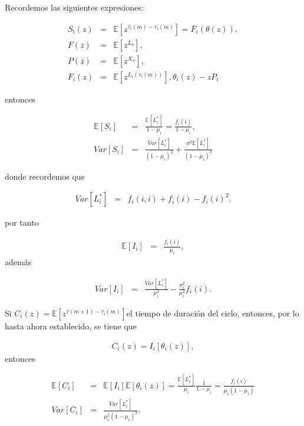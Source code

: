 \documentclass{article}
\newcommand{\esp}{\mathbb{E}}
\begin{document}
Recordemos las siguientes expresiones:

\begin{eqnarray*}
S_{i}\left(z\right)&=&\esp\left[z^{\overline{\tau}_{i}\left(m\right)-\tau_{i}\left(m\right)}\right]=F_{i}\left(\theta\left(z\right)\right),\\
F\left(z\right)&=&\esp\left[z^{L_{0}}\right],\\
P\left(z\right)&=&\esp\left[z^{X_{n}}\right],\\
F_{i}\left(z\right)&=&\esp\left[z^{L_{i}\left(\tau_{i}\left(m\right)\right)}\right],
\theta_{i}\left(z\right)-zP_{i}
\end{eqnarray*}

entonces 

\begin{eqnarray*}
\esp\left[S_{i}\right]&=&\frac{\esp\left[L_{i}^{*}\right]}{1-\mu_{i}}=\frac{f_{i}\left(i\right)}{1-\mu_{i}},\\
Var\left[S_{i}\right]&=&\frac{Var\left[L_{i}^{*}\right]}{\left(1-\mu_{i}\right)^{2}}+\frac{\sigma^{2}\esp\left[L_{i}^{*}\right]}{\left(1-\mu_{i}\right)^{3}}
\end{eqnarray*}

donde recordemos que

\begin{eqnarray*}
Var\left[L_{i}^{*}\right]&=&f_{i}\left(i,i\right)+f_{i}\left(i\right)-f_{i}\left(i\right)^{2}.
\end{eqnarray*}

 por tanto


\begin{eqnarray*}
\esp\left[I_{i}\right]&=&\frac{f_{i}\left(i\right)}{\mu_{i}},
\end{eqnarray*}
adem\'as

\begin{eqnarray*}
Var\left[I_{i}\right]&=&\frac{Var\left[L_{i}^{*}\right]}{\mu_{i}^{2}}-\frac{\sigma_{i}^{2}}{\mu_{i}^{2}}f_{i}\left(i\right).
\end{eqnarray*}


Si  $C_{i}\left(z\right)=\esp\left[z^{\overline{\tau}\left(m+1\right)-\overline{\tau}_{i}\left(m\right)}\right]$el tiempo de duraci\'on del ciclo, entonces, por lo hasta ahora establecido, se tiene que

\begin{eqnarray*}
C_{i}\left(z\right)=I_{i}\left[\theta_{i}\left(z\right)\right],
\end{eqnarray*}
entonces

\begin{eqnarray*}
\esp\left[C_{i}\right]&=&\esp\left[I_{i}\right]\esp\left[\theta_{i}\left(z\right)\right]=\frac{\esp\left[L_{i}^{*}\right]}{\mu_{i}}\frac{1}{1-\mu_{i}}=\frac{f_{i}\left(i\right)}{\mu_{i}\left(1-\mu_{i}\right)}\\
Var\left[C_{i}\right]&=&\frac{Var\left[L_{i}^{*}\right]}{\mu_{i}^{2}\left(1-\mu_{i}\right)^{2}}.
\end{eqnarray*}
\end{document}
